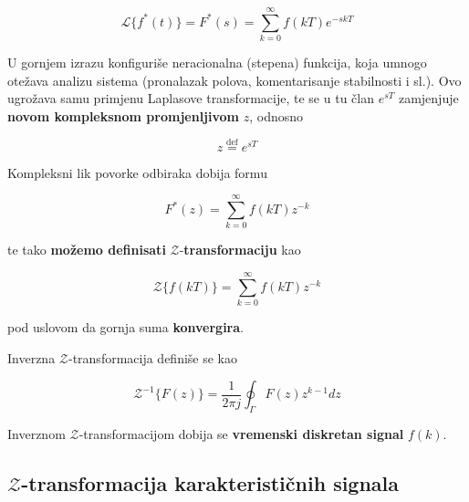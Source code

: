 \documentclass[12pt]{IEEEtran}
\numberwithin{equation}{subsection}
\numberwithin{figure}{section}
\begin{document}
\begin{equation}
    \mathcal{L}\{f^{*}(t)\} = F^{*}(s) = \sum_{k = 0}^{\infty}{f(kT)e^{-skT}}
\end{equation}

U gornjem izrazu konfiguri\v{s}e neracionalna (stepena) funkcija, koja 
umnogo ote\v{z}ava analizu sistema (pronalazak polova, komentarisanje stabilnosti i sl.).
Ovo ugro\v{z}ava samu primjenu Laplasove transformacije, te se u tu \v{c}lan 
$e^{sT}$ zamjenjuje \textbf{novom kompleksnom promjenljivom} $z$, odnosno 

\begin{equation}
    z \stackrel{\text{def}}{=} e^{sT}
\end{equation}

Kompleksni lik povorke odbiraka dobija formu 

\begin{equation}
    F^{*}(z) = \sum_{k = 0}^{\infty}{f(kT)z^{-k}}
\end{equation}

te tako \textbf{mo\v{z}emo definisati} $\mathcal{Z}$-\textbf{transformaciju} kao 

\begin{equation}
    \mathcal{Z}\{f(kT)\} = \sum_{k = 0}^{\infty}{f(kT)z^{-k}}
\end{equation}

pod uslovom da gornja suma \textbf{konvergira}.

Inverzna $\mathcal{Z}$-transformacija defini\v{s}e se kao 

\begin{equation}
    \mathcal{Z}^{-1}\{F(z)\} = \frac{1}{2 \pi j}\oint_{\Gamma}{F(z)z^{k - 1}dz}
\end{equation}

Inverznom $\mathcal{Z}$-transformacijom dobija se \textbf{vremenski diskretan signal} $f(k)$.

\subsection{\textbf{$\mathcal{Z}$-transformacija karakteristi\v{c}nih signala}}
\end{document}
